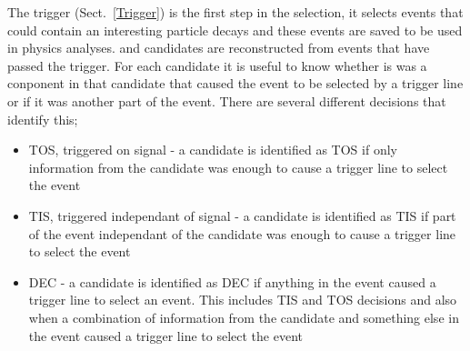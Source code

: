 

The trigger (Sect.~\ref{Trigger}) is the first step in the selection, it selects events that could contain an interesting particle decays and these events are saved to be used in physics analyses. \bsmumu and \bhh candidates are reconstructed from events that have passed the trigger. For each candidate it is useful to know whether is was a conponent in that candidate that caused the event to be selected by a trigger line or if it was another part of the event. There are several different decisions that identify this;
\begin{itemize}
\item TOS, triggered on signal - a candidate is identified as TOS if only information from the candidate was enough to cause a trigger line to select the event
\item TIS, triggered independant of signal - a candidate is identified as TIS if part of the event independant of the candidate was enough to cause a trigger line to select the event
\item DEC - a candidate is identified as DEC if anything in the event caused a trigger line to select an event. This includes TIS and TOS decisions and also when a combination of information from the candidate and something else in the event caused a trigger line to select the event
\end{itemize}

